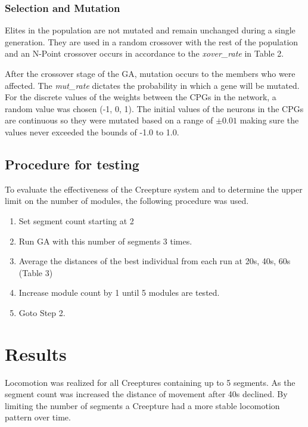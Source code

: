 \documentclass{acm_proc_article-sp}
\begin{document}
\subsubsection{Selection and Mutation}

Elites in the population are not mutated and remain unchanged during a
single generation. They are used in a random crossover with the rest of
the population and an N-Point crossover occurs in accordance to the
\emph{xover\_rate} in Table 2.

After the crossover stage of the GA, mutation occurs to the members who
were affected. The \emph{mut\_rate} dictates the probability in which a
gene will be mutated. For the discrete values of the weights between the
CPGs in the network, a random value was chosen (-1, 0, 1). The initial
values of the neurons in the CPGs are continuous so they were mutated
based on a range of $\pm 0.01$ making sure the values never exceeded the
bounds of -1.0 to 1.0.

\subsection{Procedure for testing}

To evaluate the effectiveness of the Creepture system and to determine
the upper limit on the number of modules, the following procedure was used.

\begin{enumerate}
\itemsep1pt\parskip0pt
\item
  Set segment count starting at 2
\item
  Run GA with this number of segments 3 times.
\item
  Average the distances of the best individual from each run at 20s,
  40s, 60s (Table 3)
\item
  Increase module count by 1 until 5 modules are tested.
\item
  Goto Step 2.
\end{enumerate}

\section{Results}

Locomotion was realized for all Creeptures containing up to 5 segments.
As the segment count was increased the distance of movement after 40s
declined. By limiting the number of segments a Creepture had a more
stable locomotion pattern over time. 
\end{document}
